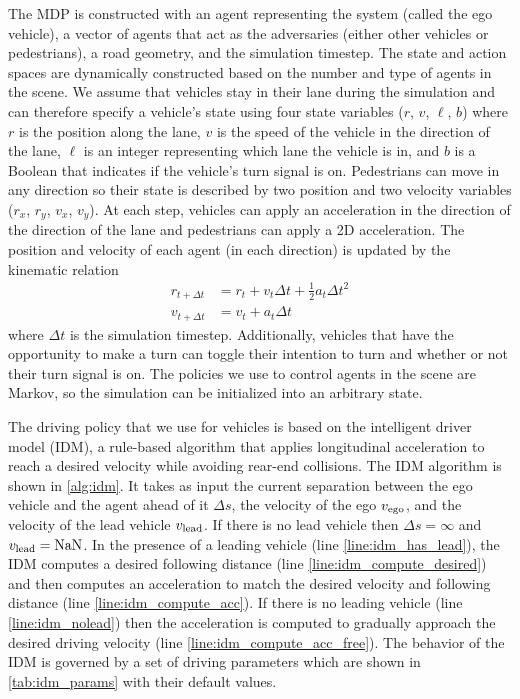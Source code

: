 The MDP is constructed with an agent representing the system (called the ego vehicle), a vector of agents that act as the adversaries (either other vehicles or pedestrians), a road geometry, and the simulation timestep. The state and action spaces are dynamically constructed based on the number and type of agents in the scene. We assume that vehicles stay in their lane during the simulation and can therefore specify a vehicle's state using four state variables ($r$, $v$, $\ell$, $b$) where $r$ is the position along the lane, $v$ is the speed of the vehicle in the direction of the lane, $\ell$ is an integer representing which lane the vehicle is in, and $b$ is a Boolean that indicates if the vehicle's turn signal is on. Pedestrians can move in any direction so their state is described by two position and two velocity variables ($r_x$, $r_y$, $v_x$, $v_y$). At each step, vehicles can apply an acceleration in the direction of the direction of the lane and pedestrians can apply a 2D acceleration. The position and velocity of each agent (in each direction) is updated by the kinematic relation
\begin{align}
    r_{t+\Delta t} &= r_t + v_t \Delta t + \frac{1}{2} a_t \Delta t^2 \label{eq:kinematics_r} \\
    v_{t+\Delta t} &= v_t + a_t \Delta t \label{eq:kinematics_v}
\end{align}
where $\Delta t$ is the simulation timestep. Additionally, vehicles that have the opportunity to make a turn can toggle their intention to turn and whether or not their turn signal is on. The policies we use to control agents in the scene are Markov, so the simulation can be initialized into an arbitrary state.


The driving policy that we use for vehicles is based on the intelligent driver model (IDM), a rule-based algorithm that applies longitudinal acceleration to reach a desired velocity while avoiding rear-end collisions. The IDM algorithm is shown in \cref{alg:idm}. It takes as input the current separation between the ego vehicle and the agent ahead of it $\Delta s$, the velocity of the ego $v_{\rm ego}$, and the velocity of the lead vehicle $v_{\rm lead}$. If there is no lead vehicle then $\Delta s = \infty$ and $v_{\rm lead} = {\rm NaN}$. In the presence of a leading vehicle (line \ref{line:idm_has_lead}), the IDM computes a desired following distance (line \ref{line:idm_compute_desired}) and then computes an acceleration to match the desired velocity and following distance (line \ref{line:idm_compute_acc}). If there is no leading vehicle (line \ref{line:idm_nolead}) then the acceleration is computed to gradually approach the desired driving velocity (line \ref{line:idm_compute_acc_free}). The behavior of the IDM is governed by a set of driving parameters which are shown in \cref{tab:idm_params} with their default values. 


